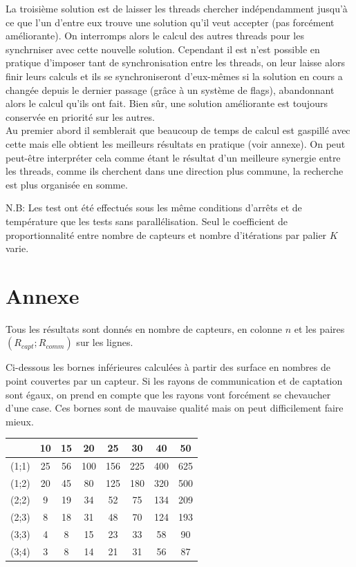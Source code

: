 \documentclass[12pt,a4paper]{article}
\begin{document}
La troisième solution est de laisser les threads chercher indépendamment jusqu'à ce que l'un d'entre eux trouve une solution qu'il veut accepter (pas forcément améliorante). On interromps alors le calcul des autres threads pour les synchrniser avec cette nouvelle solution. Cependant il est n'est possible en pratique d'imposer tant de synchronisation entre les threads, on leur laisse alors finir leurs calculs et ils se synchroniseront d'eux-mêmes si la solution en cours a changée depuis le dernier passage (grâce à un système de flags), abandonnant alors le calcul qu'ils ont fait. Bien sûr, une solution améliorante est toujours conservée en priorité sur les autres.
\\Au premier abord il semblerait que beaucoup de temps de calcul est gaspillé avec cette mais elle obtient les meilleurs résultats en pratique (voir annexe). On peut peut-être interpréter cela comme étant le  résultat d'un meilleure synergie entre les threads, comme ils cherchent dans une direction plus commune, la recherche est plus organisée en somme.

N.B: Les test ont été effectués sous les même conditions d'arrêts et de température que les tests sans parallélisation. Seul le coefficient de proportionnalité entre nombre de capteurs et nombre d'itérations par palier $K$ varie. 
\part{Annexe}
Tous les résultats sont donnés en nombre de capteurs, en colonne $n$ et les paires $(R_{capt};R_{comm})$ sur les lignes.

Ci-dessous les bornes inférieures calculées à partir des surface en nombres de point couvertes par un capteur. Si les rayons de communication et de captation sont égaux, on prend en compte que les rayons vont forcément se chevaucher d'une case. Ces bornes sont de mauvaise qualité mais on peut difficilement faire mieux.

\begin{center}
\begin{tabular}{|c|c|c|c|c|c|c|c|}
\hline
&10 & 15 & 20 & 25 & 30 & 40 & 50\\
\hline 
(1;1) & 25 & 56 & 100 & 156 & 225 & 400 & 625 \\ 
\hline 
(1;2) & 20 & 45 & 80 & 125 & 180 & 320 & 500 \\ 
\hline 
(2;2) & 9 & 19 & 34 & 52 & 75 & 134 & 209 \\ 
\hline 
(2;3) & 8 & 18 & 31 & 48 & 70 & 124 & 193 \\ 
\hline 
(3;3) & 4 & 8 & 15 & 23 & 33 & 58 & 90 \\ 
\hline 
(3;4) & 3 & 8 & 14 & 21 & 31 & 56 & 87 \\ 
\hline 
\end{tabular} 
\end{center}
\end{document}
